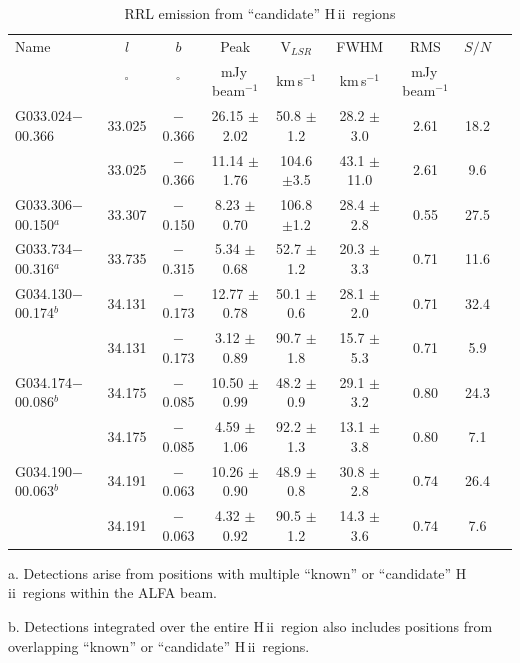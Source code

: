 \documentclass[manuscript]{aastex61}
\newcommand{\hii}{{\rm H\,}{{\sc ii}}}
\begin{document}
\begin{table}[htbp]
\centering
\caption{RRL emission from ``candidate'' \hii\ regions }\label{tab_hii_c_sample}
\begin{threeparttable}
\begin{tabular*}{\textwidth}{l@{\extracolsep{\fill}}*{8}{c}}
\hline
\hline
Name & $l$ & $b$ & Peak& V$_{LSR}$& FWHM& RMS& $S/N$\\
&$^\circ$&$^\circ$&mJy\,beam$^{-1}$&km\,s$^{-1}$&km\,s$^{-1}$&mJy\,beam$^{-1}$& \\
\hline
G033.024$-$00.366     &33.025&$-$0.366&26.15	$\pm$2.02&50.8	$\pm$1.2	&28.2	$\pm$3.0	&2.61	&18.2\\
                      &33.025&$-$0.366&11.14	$\pm$1.76&104.6	$\pm$3.5	&43.1	$\pm$11.0	&2.61	&9.6\\
G033.306$-$00.150$^a$ &33.307&$-$0.150&8.23	$\pm$0.70&106.8	$\pm$1.2	&28.4	$\pm$2.8	&0.55	&27.5\\
G033.734$-$00.316$^a$ &33.735&$-$0.315&5.34	$\pm$0.68&52.7	$\pm$1.2	&20.3	$\pm$3.3	&0.71	&11.6\\
G034.130$-$00.174$^b$ &34.131&$-$0.173&12.77	$\pm$0.78&50.1	$\pm$0.6	&28.1	$\pm$2.0	&0.71	&32.4\\
                      &34.131&$-$0.173&3.12	$\pm$0.89&90.7	$\pm$1.8	&15.7	$\pm$5.3	&0.71	&5.9\\
G034.174$-$00.086$^b$ &34.175&$-$0.085&10.50	$\pm$0.99&48.2	$\pm$0.9	&29.1	$\pm$3.2	&0.80	&24.3\\
                      &34.175&$-$0.085&4.59	$\pm$1.06&92.2	$\pm$1.3	&13.1	$\pm$3.8	&0.80	&7.1\\
G034.190$-$00.063$^b$ &34.191&$-$0.063&10.26	$\pm$0.90&48.9	$\pm$0.8	&30.8	$\pm$2.8	&0.74	&26.4\\
                      &34.191&$-$0.063&4.32	$\pm$0.92&90.5	$\pm$1.2	&14.3	$\pm$3.6	&0.74	&7.6\\
\hline
\end{tabular*}
\begin{tablenotes}
      \small
      \item a. Detections arise from positions with multiple ``known'' or ``candidate'' \hii\ regions within the ALFA beam.
      \item b. Detections integrated over the entire \hii\ region also includes positions from overlapping ``known'' or ``candidate'' \hii\ regions.
\end{tablenotes}
\end{threeparttable}
\end{table}
\end{document}
